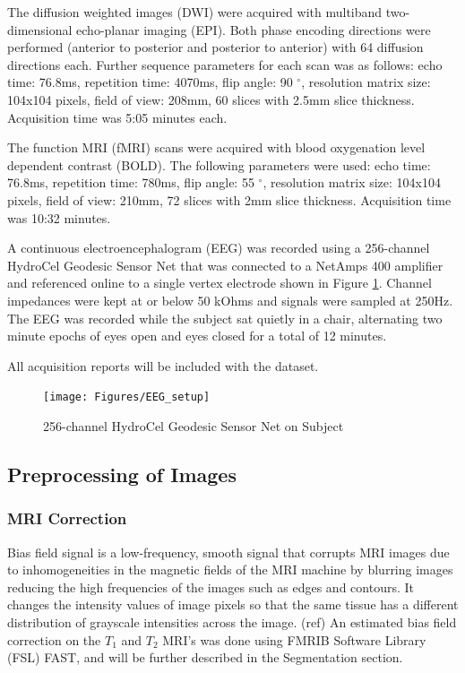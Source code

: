 The diffusion weighted images (DWI) were acquired with multiband two-dimensional echo-planar imaging (EPI). Both phase encoding directions were performed (anterior to posterior and posterior to anterior) with 64 diffusion directions each. Further sequence parameters for each scan was as follows: echo time: 76.8ms, repetition time: 4070ms, flip angle: 90 $^{\circ}$, resolution matrix size: 104x104 pixels, field of view: 208mm, 60 slices with 2.5mm slice thickness. Acquisition time was 5:05 minutes each. 

The function MRI (fMRI) scans were acquired with blood oxygenation level dependent contrast (BOLD). The following parameters were used:  echo time: 76.8ms, repetition time: 780ms, flip angle: 55 $^{\circ}$, resolution matrix size: 104x104 pixels, field of view: 210mm, 72 slices with 2mm slice thickness. Acquisition time was 10:32 minutes.

A continuous electroencephalogram (EEG) was recorded using a 256-channel HydroCel Geodesic Sensor Net that was connected to a NetAmps 400 amplifier and referenced online to a single vertex electrode shown in Figure \ref{fig:eegsetup}. Channel impedances were kept at or below 50 kOhms and signals were sampled at 250Hz. The EEG was recorded while the subject sat quietly in a chair, alternating two minute epochs of eyes open and eyes closed for a total of 12 minutes. 

All acquisition reports will be included with the dataset. 

\begin{figure}[!th]
    \centering
    \texttt{[image: Figures/EEG\_setup]}
    \caption{256-channel HydroCel Geodesic Sensor Net on Subject}
    \label{fig:eegsetup}
\end{figure}

\subsection{Preprocessing of Images}
\label{sec:preprocess}

\subsubsection{MRI Correction}

Bias field signal is a low-frequency, smooth signal that corrupts MRI images due to inhomogeneities in the magnetic fields of the MRI machine by blurring images reducing the high frequencies of the images such as edges and contours. It changes the intensity values of image pixels so that the same tissue has a different distribution of grayscale intensities across the image. (ref) An estimated bias field correction on the $T_1$ and $T_2$ MRI's was done using FMRIB Software Library (FSL) FAST, and will be further described in the Segmentation section.


